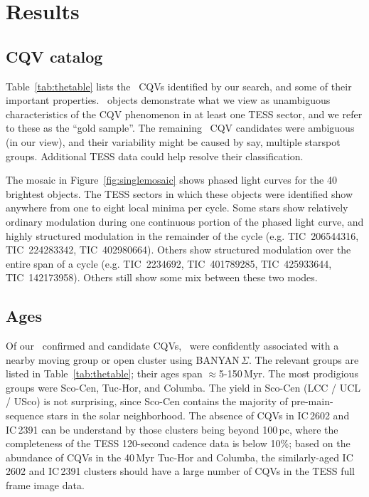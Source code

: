 \documentclass[11pt,twocolumn,tighten]{aastex63}
\begin{document}
\section{Results}
\label{sec:results}

\subsection{CQV catalog}

Table~\ref{tab:thetable} lists the \ncpvsfound\ CQVs identified by our
search, and some of their important properties.  \ngoods\ objects
demonstrate what we view as unambiguous characteristics of the CQV
phenomenon in at least one TESS sector, and we refer to these as the
``gold sample''.  The remaining \nmaybes\ CQV candidates were
ambiguous (in our view), and their variability might be caused by say,
multiple starspot groups.  Additional TESS data could help resolve
their classification.

The mosaic in Figure~\ref{fig:singlemosaic} shows phased light curves
for the 40 brightest objects.  The TESS sectors in which these objects
were identified show anywhere from one to eight local minima per
cycle.  Some stars show relatively ordinary modulation during one
continuous portion of the phased light curve, and highly structured
modulation in the remainder of the cycle (e.g. TIC~206544316,
TIC~224283342, TIC~402980664).  Others show structured modulation over
the entire span of a cycle (e.g. TIC~2234692, TIC~401789285,
TIC~425933644, TIC~142173958).  Others still show some mix between
these two modes.

\subsection{Ages}

Of our \ncpvsfound\ confirmed and candidate CQVs, \nnotfieldbanyan\
were confidently associated with a nearby moving group or open cluster
using BANYAN\,$\Sigma$.  The relevant groups are listed in
Table~\ref{tab:thetable}; their ages span $\approx$5-150\,Myr.  The
most prodigious groups were Sco-Cen, Tuc-Hor, and Columba.  The yield
in Sco-Cen (LCC / UCL / USco) is not surprising, since Sco-Cen
contains the majority of pre-main-sequence stars in the solar
neighborhood.  The absence of CQVs in IC\,2602 and IC\,2391 can be
understand by those clusters being beyond 100\,pc, where the
completeness of the TESS 120-second cadence data is below 10\%; based
on the abundance of CQVs in the 40\,Myr Tuc-Hor and Columba, the
similarly-aged IC\,2602 and IC\,2391 clusters should have a large
number of CQVs in the TESS full frame image data.
\end{document}
